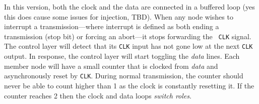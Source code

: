 In this version, both the clock and the data are connected in a buffered loop
(yes this does cause some issues for injection, TBD). When any node wishes to
interrupt a transmission---where interrupt is defined as both ending a
transmission (stop bit) or forcing an abort---it stops forwarding the {\tt
CLK} signal. The control layer will detect that its {\tt CLK} input has not
gone low at the next {\tt CLK} output. In response, the control layer will
start toggling the {\em data} lines. Each member node will have a small
counter that is clocked from {\em data} and asynchronously reset by {\tt CLK}.
During normal transmission, the counter should never be able to count higher
than 1 as the clock is constantly resetting it. If the counter reaches 2 then
the clock and data loops {\em switch roles}.

\begin{figure}[ht]
\noindent{}
\end{figure}
